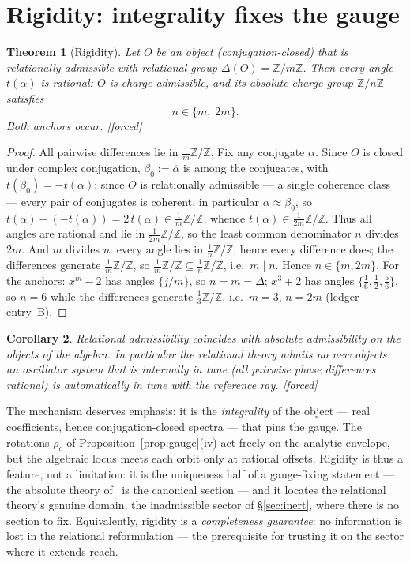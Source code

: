 \documentclass[11pt]{article}
\theoremstyle{plain}
\newtheorem{theorem}{Theorem}[section]
\newtheorem{corollary}[theorem]{Corollary}
\theoremstyle{definition}
\theoremstyle{remark}
\newcommand{\Z}{\mathbb{Z}}
\newcommand{\F}{\textnormal{[forced]}}
\begin{document}
\section{Rigidity: integrality fixes the gauge}\label{sec:rigidity}

\begin{theorem}[Rigidity]\label{thm:rigidity}
Let $O$ be an object (conjugation-closed) that is relationally admissible with
relational group $\Delta(O)=\Z/m\Z$. Then every angle $t(\alpha)$ is rational:
$O$ is charge-admissible, and its absolute charge group $\Z/n\Z$ satisfies
\[
n\in\{m,\;2m\}.
\]
Both anchors occur. \F
\end{theorem}

\begin{proof}
All pairwise differences lie in $\frac1m\Z/\Z$. Fix any conjugate $\alpha$.
Since $O$ is closed under complex conjugation, $\beta_0:=\overline{\alpha}$
is among the conjugates, with $t(\beta_0)=-t(\alpha)$; since $O$ is relationally admissible --- a single coherence class ---
every pair of conjugates is coherent, in particular $\alpha\approx\beta_0$, so
$t(\alpha)-(-t(\alpha))=2\,t(\alpha)\in\frac1m\Z/\Z$, whence
$t(\alpha)\in\frac{1}{2m}\Z/\Z$. Thus all angles are rational and lie in
$\frac{1}{2m}\Z/\Z$, so the least common denominator $n$ divides $2m$. And $m$ divides $n$:
every angle lies in $\frac1n\Z/\Z$, hence every difference does; the
differences generate $\frac1m\Z/\Z$, so
$\frac1m\Z/\Z\subseteq\frac1n\Z/\Z$, i.e.\ $m\mid n$. Hence
$n\in\{m,2m\}$. For the anchors:
$x^m-2$ has angles $\{j/m\}$, so $n=m=\Delta$; $x^3+2$ has angles
$\{\tfrac16,\tfrac12,\tfrac56\}$, so $n=6$ while the differences generate
$\tfrac13\Z/\Z$, i.e.\ $m=3$, $n=2m$ (ledger entry~B).
\end{proof}

\begin{corollary}\label{cor:nonew}
Relational admissibility coincides with absolute admissibility on the objects of
the algebra. In particular the relational theory admits no new objects: an
oscillator system that is internally in tune (all pairwise phase differences
rational) is automatically in tune with the reference ray. \F
\end{corollary}

The mechanism deserves emphasis: it is the \emph{integrality} of the object ---
real coefficients, hence conjugation-closed spectra --- that pins the gauge. The
rotations $\rho_c$ of Proposition~\ref{prop:gauge}(iv) act freely on the analytic
envelope, but the algebraic locus meets each orbit only at rational offsets.
Rigidity is thus a feature, not a limitation: it is the uniqueness half of a
gauge-fixing statement --- the absolute theory of~\cite{CMC} is the canonical
section --- and it locates the relational theory's genuine domain, the
inadmissible sector of \S\ref{sec:inert}, where there is no section to fix.
Equivalently, rigidity is a \emph{completeness guarantee}: no information is
lost in the relational reformulation --- the prerequisite for trusting it on
the sector where it extends reach.
\end{document}
